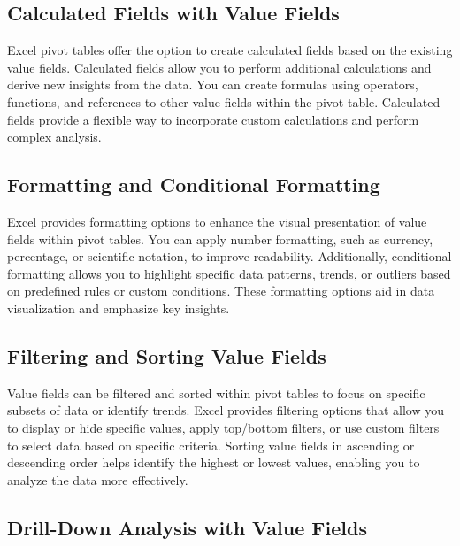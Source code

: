 \documentclass[
]{book}
\begin{document}
\hypertarget{calculated-fields-with-value-fields}{%
\subsection{Calculated Fields with Value Fields}\label{calculated-fields-with-value-fields}}

Excel pivot tables offer the option to create calculated fields based on the existing value fields. Calculated fields allow you to perform additional calculations and derive new insights from the data. You can create formulas using operators, functions, and references to other value fields within the pivot table. Calculated fields provide a flexible way to incorporate custom calculations and perform complex analysis.

\hypertarget{formatting-and-conditional-formatting}{%
\subsection{Formatting and Conditional Formatting}\label{formatting-and-conditional-formatting}}

Excel provides formatting options to enhance the visual presentation of value fields within pivot tables. You can apply number formatting, such as currency, percentage, or scientific notation, to improve readability. Additionally, conditional formatting allows you to highlight specific data patterns, trends, or outliers based on predefined rules or custom conditions. These formatting options aid in data visualization and emphasize key insights.

\hypertarget{filtering-and-sorting-value-fields}{%
\subsection{Filtering and Sorting Value Fields}\label{filtering-and-sorting-value-fields}}

Value fields can be filtered and sorted within pivot tables to focus on specific subsets of data or identify trends. Excel provides filtering options that allow you to display or hide specific values, apply top/bottom filters, or use custom filters to select data based on specific criteria. Sorting value fields in ascending or descending order helps identify the highest or lowest values, enabling you to analyze the data more effectively.

\hypertarget{drill-down-analysis-with-value-fields}{%
\subsection{Drill-Down Analysis with Value Fields}\label{drill-down-analysis-with-value-fields}}
\end{document}
